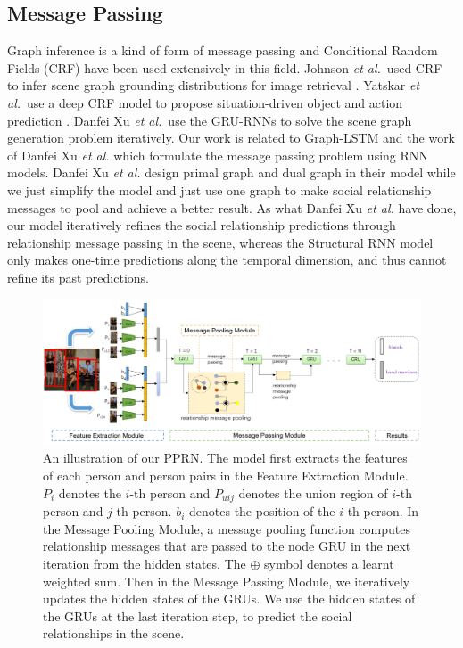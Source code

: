 \documentclass{article}
\newcommand{\PPRN}{{\sf PPRN}}
\newcommand{\etal}{{\it et al.}}
\begin{document}
\subsection{Message Passing}%
Graph inference is a kind of form of message passing and Conditional Random Fields (CRF) have been used extensively in this field. Johnson \etal \ used CRF to infer scene graph grounding distributions for image retrieval \cite{DBLP:conf/cvpr/JohnsonKSLSBL15}. Yatskar \etal \ use a deep CRF model to propose situation-driven object and action prediction\cite{DBLP:conf/cvpr/YatskarZF16} . Danfei Xu \etal \ use the GRU-RNNs to solve the scene graph generation problem iteratively\cite{DBLP:conf/cvpr/XuZCF17}. Our work is related to Graph-LSTM \cite{DBLP:conf/eccv/LiangSFLY16} and  the work of  Danfei Xu \etal \cite{DBLP:conf/cvpr/XuZCF17} which formulate the message passing problem using RNN models. Danfei Xu \etal \cite{DBLP:conf/cvpr/XuZCF17} design primal graph and dual graph in their model while we just simplify the model and just use one graph to make social relationship messages to pool and achieve a better result. As what Danfei Xu \etal \cite{DBLP:conf/cvpr/XuZCF17} have done, our model iteratively refines the social relationship predictions through relationship message passing in the scene, whereas the Structural RNN model only makes one-time predictions along the temporal dimension, and thus cannot refine its past predictions\cite{DBLP:conf/cvpr/XuZCF17}.
\vspace*{-3mm}
\begin{figure}[htpb]
	\centering
	\includegraphics[width=0.96 \textwidth,clip]{./pic/model_4.png}
	\caption{An illustration of our \PPRN . The model first extracts the features of each person and person pairs in the Feature Extraction Module. $P_i$ denotes the $i$-th person and $P_{uij}$ denotes the union region of $i$-th person and $j$-th person. $b_i$ denotes the position of the $i$-th person. In the Message Pooling Module, a message pooling function computes relationship messages that are passed to the node GRU in the next iteration from the hidden states. The $\oplus$ symbol denotes a learnt weighted sum. Then in the Message Passing Module, we iteratively updates the hidden states of the GRUs. We use the hidden states of the GRUs at the last iteration step, to predict the social relationships in the scene.}
	\vspace*{-3.5mm}
	\label{fig:model}
\end{figure}
\end{document}
